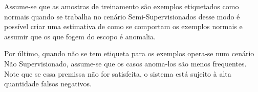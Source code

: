 Assume-se que as amostras de treinamento são exemplos etiquetados como normais quando se trabalha no cenário Semi-Supervisionados desse modo é possível criar uma estimativa de como se comportam os exemplos normais e assumir que os que fogem do escopo é anomalia.

Por último, quando não se tem etiqueta para os exemplos opera-se num cenário Não Supervisionado, assume-se que os casos anoma-los são menos frequentes. Note que se essa premissa não for satisfeita, o sistema está sujeito à alta quantidade falsos negativos.










